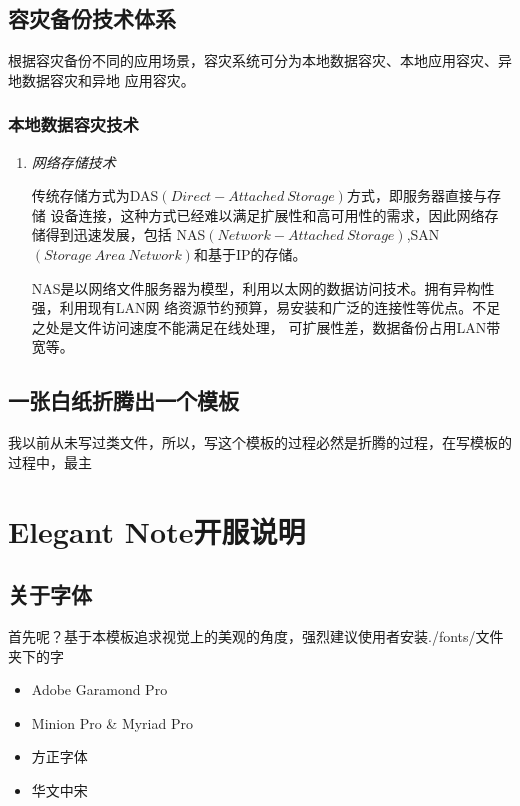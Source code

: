 \documentclass[cyan]{elegantnote}
\begin{document}
\section{容灾备份技术体系}

根据容灾备份不同的应用场景，容灾系统可分为本地数据容灾、本地应用容灾、异地数据容灾和异地
应用容灾。
\subsection{本地数据容灾技术}
\begin{enumerate}
    \item \emph{网络存储技术}

    传统存储方式为DAS$\left(Direct-Attached\ Storage\right)$方式，即服务器直接与存储
    设备连接，这种方式已经难以满足扩展性和高可用性的需求，因此网络存储得到迅速发展，包括
    NAS$\left(Network-Attached\ Storage\right)$,SAN$\left(Storage\ Area\ Network
    \right)$和基于IP的存储。

    NAS是以网络文件服务器为模型，利用以太网的数据访问技术。拥有异构性强，利用现有LAN网
    络资源节约预算，易安装和广泛的连接性等优点。不足之处是文件访问速度不能满足在线处理，
    可扩展性差，数据备份占用LAN带宽等。
\end{enumerate}



\section{一张白纸折腾出一个模板}

我以前从未写过类文件，所以，写这个模板的过程必然是折腾的过程，在写模板的过程中，最主


\chapter{Elegant Note开服说明}

\section{关于字体}

首先呢？基于本模板追求视觉上的美观的角度，强烈建议使用者安装./fonts/文件夹下的字
\begin{itemize}
\itemsep=3pt
\parskip=0pt
\item Adobe Garamond Pro
\item Minion Pro \& Myriad Pro
\item 方正字体
\item 华文中宋
\end{itemize}
\end{document}

